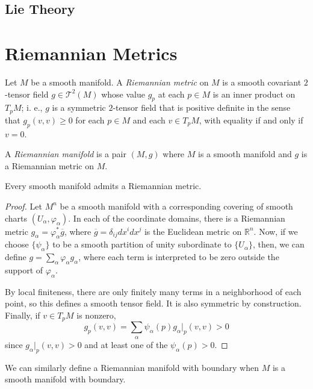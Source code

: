 \documentclass[11pt]{scrartcl}
\newcommand{\R}{\mathbb{R}}
\newcommand{\<}{\langle}
\renewcommand{\>}{\rangle}
\let \phi \varphi
\let \mc \mathcal
\let \bar \overline
\newcommand{\1}{\textbf{1}} %
\begin{document}
\subsection{Lie Theory}

\section{Riemannian Metrics}
\begin{definition} Let $M$ be a smooth manifold.  A \textit{Riemannian metric} on $M$ is a smooth covariant $2$-tensor field $g \in \mc T^2(M)$ whose value $g_p$ at each $p \in M$ is an inner product on $T_pM$; i. e., $g$ is a symmetric $2$-tensor field that is positive definite in the sense that $g_p(v, v) \ge 0$ for each $p \in M$ and each $v \in T_pM$, with equality if and only if $v = 0$.
\end{definition}

\begin{definition} A \textit{Riemannian manifold} is a pair $(M, g)$ where $M$ is a smooth manifold and $g$ is a Riemannian metric on $M$.
\end{definition}

\begin{proposition} Every smooth manifold admits a Riemannian metric.
\end{proposition}
\begin{proof}
Let $M^n$ be a smooth manifold with a corresponding covering of smooth charts $(U_\alpha, \phi_\alpha)$.  In each of the coordinate domains, there is a Riemannian metric $g_{\alpha} = \phi_{\alpha}^* \bar{g}$, where $\bar{g} = \delta_{ij} dx^i dx^j$ is the Euclidean metric on $\R^n$.  Now, if we choose $\{\psi_{\alpha}\}$ to be a smooth partition of unity subordinate to $\{U_{\alpha}\}$, then, we can define $g = \sum_{\alpha} \phi_{\alpha} g_{\alpha}$, where each term is interpreted to be zero outside the support of $\phi_{\alpha}$.

By local finiteness, there are only finitely many terms in a neighborhood of each point, so this defines a smooth tensor field.  It is also symmetric by construction.  Finally, if $v \in T_pM$ is nonzero,
$$g_p(v, v) = \sum_{\alpha} \psi_{\alpha}(p) g_{\alpha}\vert_p(v, v) > 0$$
since $g_{\alpha}\vert_p(v, v) > 0$ and at least one of the $\psi_{\alpha}(p) > 0$.
\end{proof}

We can similarly define a Riemannian manifold with boundary when $M$ is a smooth manifold with boundary.  
\end{document}
